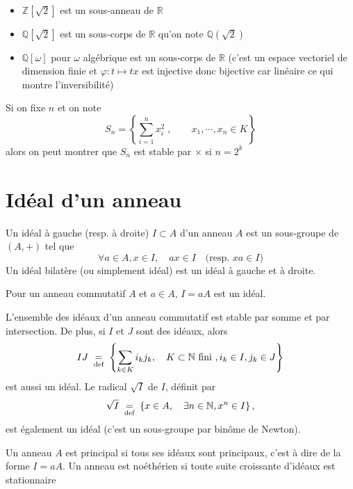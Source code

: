 \begin{ex}~
    \begin{itemize}
        \item $\mathbb Z[\sqrt 2]$ est un sous-anneau de $\mathbb R$
        \item $\mathbb Q[\sqrt 2]$ est un sous-corps de $\mathbb R$ qu'on note $\mathbb Q(\sqrt 2)$
        \item $\mathbb Q[\omega]$ pour $\omega$ algébrique est un sous-corps de $\mathbb R$ (c'est un espace vectoriel de dimension finie et $\varphi: t\longmapsto tx$ est injective donc bijective car linéaire ce qui montre l'inversibilité)
    \end{itemize}
\end{ex}

\begin{rem}
    Si on fixe $n$ et on note \[
        S_n=\left\{\sum_{i=1}^nx_i^2\;, \qquad x_1, \cdots, x_n\in K\right\}
    \]
    alors on peut montrer que $S_n$ est stable par $\times$ si $n=2^k$
\end{rem}

\section{Idéal d'un anneau}

\begin{dfn}
    Un idéal à gauche (resp. à droite) $I\subset A$ d'un anneau $A$ est un sous-groupe de $(A, +)$ tel que \[
        \forall a\in A, x\in I,\quad  ax\in I\quad \text{(resp. $xa\in I$)}
    \]
    Un idéal bilatère (ou simplement idéal) est un idéal à gauche et à droite.
\end{dfn}


\begin{rem}
    Pour un anneau commutatif $A$ et $a\in A$, $I=aA$ est un idéal.
\end{rem}

L'ensemble des idéaux d'un anneau commutatif est stable par somme et par intersection. De plus, si $I$ et $J$ sont des idéaux, alors \[
    IJ \;\underset{\text{def}}=\; \left\{ \sum_{k\in K}i_kj_k, \quad K\subset \mathbb N \text{ fini }, i_k\in I, j_k\in J \right\}
\]
est aussi un idéal. Le radical $\sqrt I$ de $I$, définit par \[
    \sqrt I \;\underset{\text{def}}=\; \left\{ x\in A, \quad \exists n\in\mathbb N, x^n\in I \right\},
\]
est également un idéal (c'est un sous-groupe par binôme de Newton).

\begin{dfn}
    Un anneau $A$ est principal si tous ses idéaux sont principaux, c'est à dire de la forme $I=aA$. Un anneau est noéthérien si toute suite croissante d'idéaux est stationnaire
\end{dfn}

